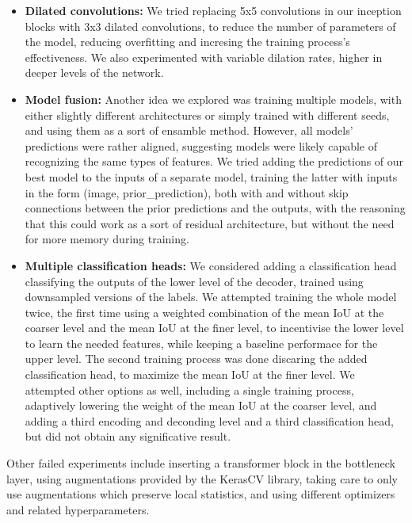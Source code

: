 \documentclass[11pt]{article}
\begin{document}
\begin{multicols}{2}
\begin{itemize}[leftmargin=*]
            \item \textbf{Dilated convolutions:} We tried replacing 5x5 convolutions in our inception blocks with 3x3 dilated convolutions, to reduce the number of parameters of the model, reducing overfitting and incresing the training process's effectiveness. We also experimented with variable dilation rates, higher in deeper levels of the network.
            \item \textbf{Model fusion:} Another idea we explored was training multiple models, with either slightly different architectures or simply trained with different seeds, and using them as a sort of ensamble method. However, all models' predictions were rather aligned, suggesting models were likely capable of recognizing the same types of features. We tried adding the predictions of our best model to the inputs of a separate model, training the latter with inputs in the form (image, prior\_prediction), both with and without skip connections between the prior predictions and the outputs, with the reasoning that this could work as a sort of residual architecture, but without the need for more memory during training.
            \item \textbf{Multiple classification heads:} We considered adding a classification head classifying the outputs of the lower level of the decoder, trained using downsampled versions of the labels. We attempted training the whole model twice, the first time using a weighted combination of the mean IoU at the coarser level and the mean IoU at the finer level, to incentivise the lower level to learn the needed features, while keeping a baseline performace for the upper level. The second training process was done discaring the added classification head, to maximize the mean IoU at the finer level. We attempted other options as well, including a single training process, adaptively lowering the weight of the mean IoU at the coarser level, and adding a third encoding and deconding level and a third classification head, but did not obtain any significative result.
      \end{itemize}
      Other failed experiments include inserting a transformer block in the bottleneck layer, using augmentations provided by the KerasCV library, taking care to only use augmentations which preserve local statistics, and using different optimizers and related hyperparameters.



\end{multicols}
\end{document}

